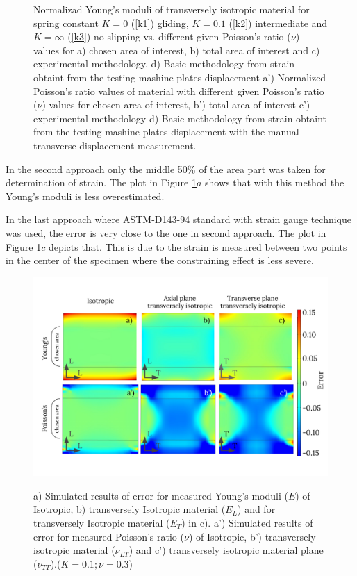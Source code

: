 \documentclass[review]{elsarticle}
\begin{document}
\begin{center}
\begin{figure}[h]
\captionsetup{justification=centering}
\caption{Normalizad Young's moduli of transversely isotropic
material for spring constant $K=0$ (\ref{k1}) gliding, $K=0.1$ (\ref{k2})
intermediate and $K=\infty$ (\ref{k3}) no slipping vs.
different given Poisson's ratio ($\nu$) values for a) chosen area of
interest, b) total area of interest and c) experimental methodology.
d) Basic methodology from strain obtaint from the testing mashine plates
displacement a') Normalized Poisson's ratio values of material with different
given Poisson's ratio ($\nu$) values for chosen area of
interest, b') total area of interest c') experimental methodology d) Basic methodology from strain obtaint from the testing mashine plates
displacement with the manual transverse displacement measurement.}
\label{fig:strainmethods}


\end{figure}
\end{center}



In the second approach only the middle 50\% of the area part was
taken for determination of strain. The plot in Figure \ref{fig:strainmethods}$a$
shows that with this method the Young's moduli is less overestimated.\par
  In the last approach where ASTM-D143-94 standard
with strain gauge technique was used, the error is very close to the one in
second approach. The plot in Figure \ref{fig:strainmethods}$c$ depicts that.
This is due to the strain is measured between two points in the center of 
the specimen where the constraining effect is less severe. 

\begin{figure}[h]
\centering
\includegraphics[width=\textwidth]{BarellingError.pdf}
\label{fig:Error}
\caption{\label{fig:Error} a) Simulated results of error for measured Young's
moduli ($E$) of Isotropic, b) transversely Isotropic material ($E_L$) and for
transversely Isotropic material ($E_T$) in c). 
a') Simulated results of error for measured
Poisson's ratio ($\nu$) of Isotropic, b')
transversely isotropic material ($\nu_{LT}$) and c') transversely isotropic
material plane ($\nu_{TT}$).($K=0.1;\nu=0.3$)}

\end{figure}
\end{document}
